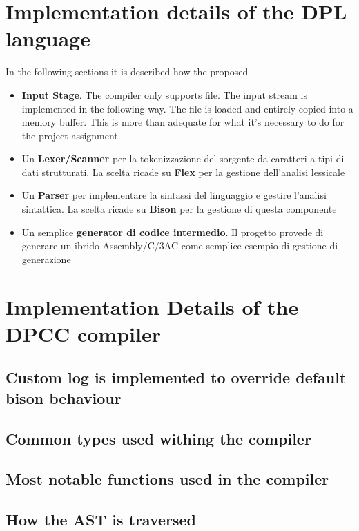 \documentclass[a4paper]{article}
\begin{document}
\section{Implementation details of the DPL language}
In the following sections it is described how the proposed
\begin{itemize}
\item \textbf{Input Stage}. The compiler only supports file. The input stream is implemented
    in the following way. The file is loaded and entirely copied into a memory buffer. This is more
    than adequate for what it's necessary to do for the project assignment.
\item Un \textbf{Lexer/Scanner} per la tokenizzazione del sorgente da caratteri a tipi di dati strutturati. La scelta ricade su \textbf{Flex} per la gestione dell'analisi lessicale
\item Un \textbf{Parser} per implementare la sintassi del linguaggio e gestire l'analisi sintattica. La scelta ricade su \textbf{Bison} per la gestione di questa componente
\item Un semplice \textbf{generator di codice intermedio}. Il progetto provede di generare un ibrido Assembly/C/3AC come semplice esempio di gestione di generazione
\end{itemize}




\section{Implementation Details of the DPCC compiler}
\subsection{Custom log is implemented to override default bison behaviour}

\subsection{Common types used withing the compiler}


\subsection{Most notable functions used in the compiler}

\subsection{How the AST is traversed}
\end{document}
